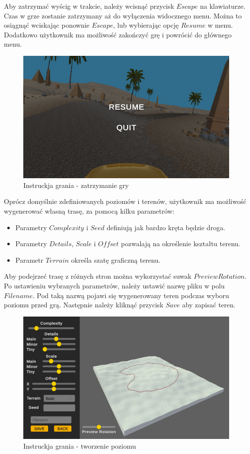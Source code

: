     Aby zatrzymać wyścig w trakcie, należy wcisnąć przycisk $Escape$ na klawiaturze. Czas w grze zostanie zatrzymany aż do wyłączenia widocznego menu.
    Można to osiągnąć wciskając ponownie $Escape$, lub wybierając opcję $Resume$ w menu. Dodatkowo użytkownik ma możliwość zakończyć grę i powrócić
    do głównego menu.
    \begin{figure}[H]
        \centering
        \includegraphics[width=.7\textwidth]{figures/game_instruction_pause.png}
        \caption{Instruckja grania - zatrzymanie gry}
        \label{fig}
    \end{figure}
    \clearpage
    Oprócz domyślnie zdefiniowanych poziomów i terenów, użytkownik ma możliwość wygenerować własną trasę, za pomocą kilku parametrów:
    \begin{itemize}
        \item Parametry $Complexity$ i $Seed$ definiują jak bardzo kręta będzie droga.
        \item Parametry $Details$, $Scale$ i $Offset$ pozwalają na określenie kształtu terenu.
        \item Parametr $Terrain$ określa szatę graficzną terenu.
    \end{itemize}
    Aby podejrzeć trasę z różnych stron można wykorzystać suwak $Preview Rotation$.\\
    Po ustawieniu wybranych parametrów, należy ustawić nazwę pliku w polu $Filename$. Pod taką nazwą pojawi się 
    wygenerowany teren podczas wyboru poziomu przed grą. Następnie należy kliknąć przycisk $Save$ aby zapisać teren.
    \begin{figure}[H]
        \centering
        \includegraphics[width=.7\textwidth]{figures/game_instruction_create.png}
        \caption{Instruckja grania - tworzenie poziomu}
        \label{fig}
    \end{figure}